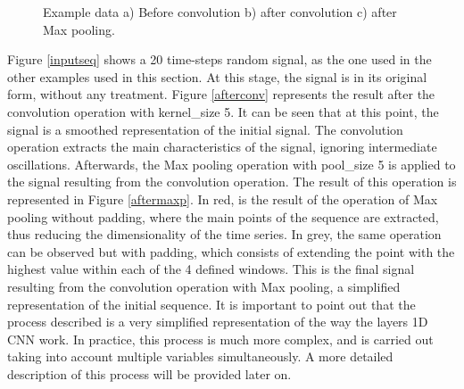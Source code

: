 \begin{figure}[h!]
\captionsetup[subfigure]{position=b}
\centering
{}
\caption{Example data a) Before convolution b) after convolution c) after Max pooling.}
\label{resdata}
\end{figure}


Figure \ref{inputseq} shows a 20 time-steps random signal, as the one used in the other examples used in this section. At this stage, the signal is in its original form, without any treatment. Figure \ref{afterconv} represents the result after the convolution operation with kernel\_size 5. It can be seen that at this point, the signal is a smoothed representation of the initial signal. The convolution operation extracts the main characteristics of the signal, ignoring intermediate oscillations. Afterwards, the Max pooling operation with pool\_size 5 is applied to the signal resulting from the convolution operation. The result of this operation is represented in Figure \ref{aftermaxp}. In red, is the result of the operation of Max pooling without padding, where the main points of the sequence are extracted, thus reducing the dimensionality of the time series. In grey, the same operation can be observed but with padding,  which consists of extending the point with the highest value within each of the 4 defined windows. This is the final signal resulting from the convolution operation with Max pooling, a simplified representation of the initial sequence. It is important to point out that the process described is a very simplified representation of the way the layers \ac{1D CNN} work. In practice, this process is much more complex, and is carried out taking into account multiple variables simultaneously. A more detailed description of this process will be provided later on. 

